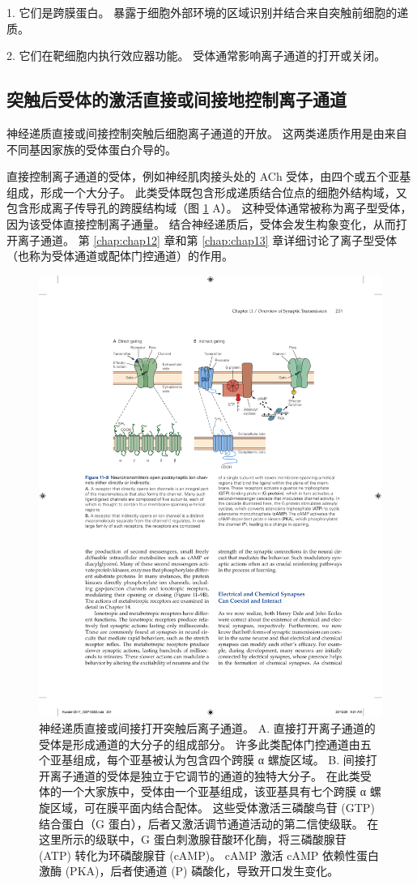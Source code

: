 1. 它们是跨膜蛋白。 
暴露于细胞外部环境的区域识别并结合来自突触前细胞的递质。 


2. 它们在靶细胞内执行效应器功能。 
受体通常影响离子通道的打开或关闭。


\subsection{突触后受体的激活直接或间接地控制离子通道}

神经递质直接或间接控制突触后细胞离子通道的开放。 
这两类递质作用是由来自不同基因家族的受体蛋白介导的。


直接控制离子通道的受体，例如神经肌肉接头处的 ACh 受体，由四个或五个亚基组成，形成一个大分子。 
此类受体既包含形成递质结合位点的细胞外结构域，又包含形成离子传导孔的跨膜结构域（图 \ref{fig:11_9} A）。 
这种受体通常被称为离子型受体，因为该受体直接控制离子通量。
结合神经递质后，受体会发生构象变化，从而打开离子通道。 第 \ref{chap:chap12} 章和第 \ref{chap:chap13} 章详细讨论了离子型受体（也称为受体通道或配体门控通道）的作用。

\begin{figure}[htbp]
	\centering
	\includegraphics[width=0.7\linewidth]{chap11/fig_11_9}
	\caption{神经递质直接或间接打开突触后离子通道。 A. 直接打开离子通道的受体是形成通道的大分子的组成部分。 许多此类配体门控通道由五个亚基组成，每个亚基被认为包含四个跨膜 α 螺旋区域。 B. 间接打开离子通道的受体是独立于它调节的通道的独特大分子。 在此类受体的一个大家族中，受体由一个亚基组成，该亚基具有七个跨膜 α 螺旋区域，可在膜平面内结合配体。 这些受体激活三磷酸鸟苷 (GTP) 结合蛋白（G 蛋白），后者又激活调节通道活动的第二信使级联。 在这里所示的级联中，G 蛋白刺激腺苷酸环化酶，将三磷酸腺苷 (ATP) 转化为环磷酸腺苷 (cAMP)。 cAMP 激活 cAMP 依赖性蛋白激酶 (PKA)，后者使通道 (P) 磷酸化，导致开口发生变化。}
	\label{fig:11_9}
\end{figure}


